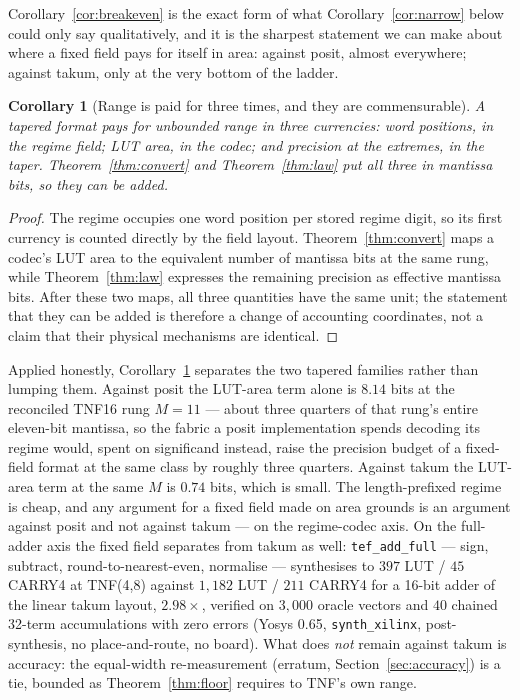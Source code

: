 \documentclass[11pt]{article}
\newtheorem{corollary}{Corollary}
\theoremstyle{definition}
\begin{document}
Corollary~\ref{cor:breakeven} is the exact form of what
Corollary~\ref{cor:narrow} below could only say qualitatively, and it is the sharpest
statement we can make about where a fixed field pays for itself in area: against
posit, almost everywhere; against takum, only at the very bottom of the ladder.

\begin{corollary}[Range is paid for three times, and they are commensurable]
\label{cor:three}
A tapered format pays for unbounded range in three currencies: word positions,
in the regime field; LUT area, in the codec; and precision at the extremes, in the
taper. Theorem~\ref{thm:convert} and Theorem~\ref{thm:law} put all three in
mantissa bits, so they can be added.
\end{corollary}
\begin{proof}
The regime occupies one word position per stored regime digit, so its first currency
is counted directly by the field layout. Theorem~\ref{thm:convert} maps a codec's
LUT area to the equivalent number of mantissa bits at the same rung, while
Theorem~\ref{thm:law} expresses the remaining precision as effective mantissa bits.
After these two maps, all three quantities have the same unit; the statement that
they can be added is therefore a change of accounting coordinates, not a claim that
their physical mechanisms are identical.
\end{proof}

Applied honestly, Corollary~\ref{cor:three} separates the two tapered families
rather than lumping them. Against posit the LUT-area term alone is $8.14$ bits at
the reconciled TNF16 rung $M = 11$ --- about three quarters of that rung's entire
eleven-bit mantissa, so the fabric a posit implementation spends decoding its
regime would, spent on significand instead, raise the precision budget of a
fixed-field format at the same class by roughly three quarters. Against takum the
LUT-area term at the same $M$ is $0.74$ bits, which is small. The
length-prefixed regime is cheap, and any argument for a fixed field made on area
grounds is an argument against posit and not against takum --- on the
regime-codec axis. On the full-adder axis the fixed field separates from takum
as well: \texttt{tef\_add\_full} --- sign, subtract, round-to-nearest-even,
normalise --- synthesises to $397$ LUT / $45$ CARRY4 at TNF(4,8) against
$1{,}182$ LUT / $211$ CARRY4 for a 16-bit adder of the linear takum layout,
$2.98\times$, verified on $3{,}000$ oracle vectors and $40$ chained 32-term
accumulations with zero errors (Yosys 0.65, \texttt{synth\_xilinx},
post-synthesis, no place-and-route, no board). What does \emph{not} remain
against takum is accuracy: the equal-width re-measurement (erratum,
Section~\ref{sec:accuracy}) is a tie, bounded as Theorem~\ref{thm:floor}
requires to TNF's own range.
\end{document}
